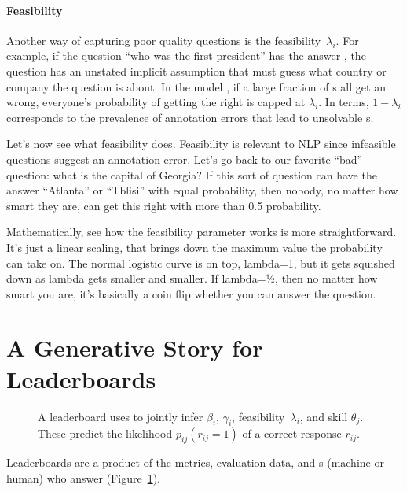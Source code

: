 \paragraph{Feasibility}

Another way of capturing poor quality questions is the
feasibility~$\lambda_i$.
For example, if the question ``who was the first president'' has the
answer , the question has an unstated implicit
assumption that \subjs{} must guess what country or company the
question is about.
In the model {\bf {}}, if a large fraction of \subj{}s all get an
\itm{} wrong, everyone's probability of getting the \itm{} right is
capped at $\lambda_i$.
In \nlp{} terms, $1-\lambda_i$ corresponds to the prevalence of annotation
errors that lead to unsolvable \itm{}s.


Let’s now see what feasibility does.  Feasibility is relevant to NLP since
infeasible questions suggest an annotation error. Let’s go back to our
favorite ``bad'' question: what is the capital of Georgia?  If this sort of
question can have the answer ``Atlanta'' or ``Tblisi'' with equal probability,
then nobody, no matter how smart they are, can get this right with more than
0.5 probability.

Mathematically, see how the feasibility parameter works is more
straightforward.  It’s just a linear scaling, that brings down the maximum
value the probability can take on.  The normal logistic curve is on top,
lambda=1, but it gets squished down as lambda gets smaller and smaller.  If
lambda=½, then no matter how smart you are, it’s basically a coin flip whether
you can answer the question.

\section{A Generative Story for Leaderboards}
\label{ch:isicle:lead}

\begin{figure}[t]
  \centering
  \caption{
    A \name{} leaderboard uses \irt{} to jointly infer \itm{} \diff{} $\beta_i$, \discability{} $\gamma_i$, feasibility~$\lambda_i$, and \subj{} skill $\theta_j$.
    These predict the likelihood $p_{ij}(r_{ij}=1)$ of a correct response $r_{ij}$.
  }
  \label{fig:story}
\end{figure}

Leaderboards are a product of the metrics, evaluation data, and
\subj{}s (machine or human) who answer \itms{}
(Figure~\ref{fig:story}).


